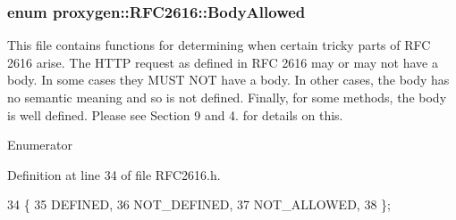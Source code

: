 \subsubsection[{Body\+Allowed}]{\setlength{\rightskip}{0pt plus 5cm}enum {\bf proxygen\+::\+R\+F\+C2616\+::\+Body\+Allowed}\hspace{0.3cm}{\ttfamily [strong]}}\label{namespaceproxygen_1_1RFC2616_acb9891a80a8184a88b2ebe39c4950b5b}
This file contains functions for determining when certain tricky parts of R\+FC 2616 arise. The H\+T\+TP request as defined in R\+FC 2616 may or may not have a body. In some cases they M\+U\+ST N\+OT have a body. In other cases, the body has no semantic meaning and so is not defined. Finally, for some methods, the body is well defined. Please see Section 9 and 4. for details on this. \begin{Desc}
\item[Enumerator]\par
\begin{description}
\item[{\em 
D\+E\+F\+I\+N\+ED\label{namespaceproxygen_1_1RFC2616_acb9891a80a8184a88b2ebe39c4950b5bad95be57411fe22c8d2c9e829b2a0cf85}
}]\item[{\em 
N\+O\+T\+\_\+\+D\+E\+F\+I\+N\+ED\label{namespaceproxygen_1_1RFC2616_acb9891a80a8184a88b2ebe39c4950b5babfd8c78fbb91fe67b9886fad146392a4}
}]\item[{\em 
N\+O\+T\+\_\+\+A\+L\+L\+O\+W\+ED\label{namespaceproxygen_1_1RFC2616_acb9891a80a8184a88b2ebe39c4950b5ba4596302bc1e8ce6e62188e769aac94cf}
}]\end{description}
\end{Desc}


Definition at line 34 of file R\+F\+C2616.\+h.


\begin{DoxyCode}
34                        \{
35   DEFINED,
36   NOT_DEFINED,
37   NOT_ALLOWED,
38 \};
\end{DoxyCode}


